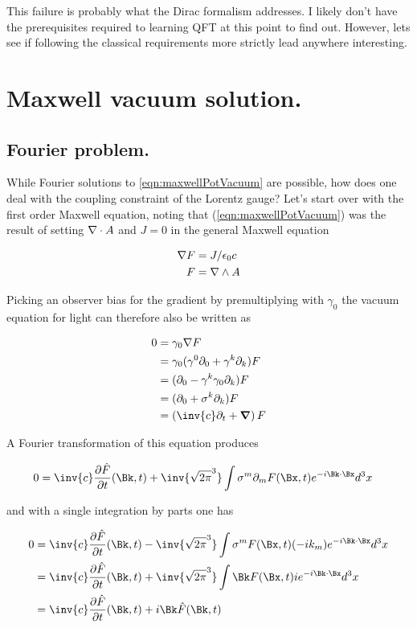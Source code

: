 \documentclass[]{eliblog}
\begin{document}
This failure is probably what the Dirac formalism addresses.  I likely don't have the prerequisites required to learning QFT at this point to find out.  However, lets see if following the classical requirements more strictly lead anywhere interesting.

\section{Maxwell vacuum solution.}

\subsection{Fourier problem.}
While Fourier solutions to \ref{eqn:maxwellPotVacuum} are possible, how does one deal with the coupling constraint of the Lorentz gauge?  Let's start
over with the first order Maxwell equation, noting that (\ref{eqn:maxwellPotVacuum}) was the result of setting $\nabla \cdot A$ and $J = 0$ in the
general Maxwell equation

\begin{align}\label{eqn:maxwell}
\nabla F &= J/\epsilon_0 c \\
F &= \nabla \wedge A
\end{align}

Picking an observer bias for the gradient by premultiplying with $\gamma_0$ the vacuum equation for light can therefore also be written as

\begin{align*}
0
&= \gamma_0 \grad F \\
&= \gamma_0 (\gamma^0 \partial_0 + \gamma^k \partial_k) F \\
&= (\partial_0 - \gamma^k \gamma_0 \partial_k) F \\
&= (\partial_0 + \sigma^k \partial_k) F \\
&= \left(\inv{c}\partial_t + \spacegrad \right) F \\
\end{align*}

A Fourier transformation of this equation produces

\begin{align*}
0 &= \inv{c} \PD{t}{\hat{F}}(\Bk,t) + \inv{\sqrt{2\pi}^3} \int \sigma^m \partial_m F(\Bx,t) e^{-i \Bk \cdot \Bx} d^3 x
\end{align*}

and with a single integration by parts one has

\begin{align*}
0
&= \inv{c} \PD{t}{\hat{F}}(\Bk,t) - \inv{\sqrt{2\pi}^3} \int \sigma^m F(\Bx,t) (-i k_m) e^{-i \Bk \cdot \Bx} d^3 x \\
&= \inv{c} \PD{t}{\hat{F}}(\Bk,t) + \inv{\sqrt{2\pi}^3} \int \Bk F(\Bx,t) i e^{-i \Bk \cdot \Bx} d^3 x \\
&= \inv{c} \PD{t}{\hat{F}}(\Bk,t) + i \Bk \hat{F}(\Bk,t)
\end{align*}
\end{document}
